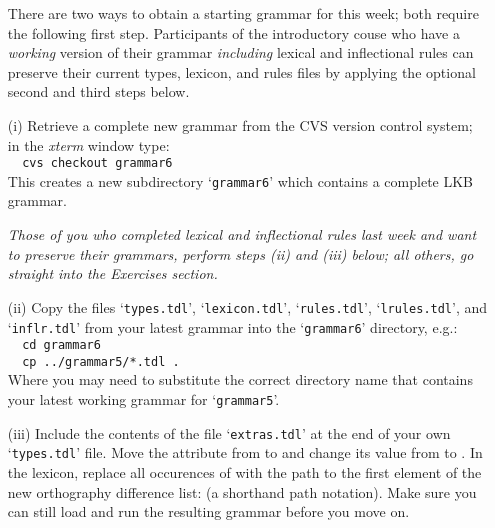 \documentclass[10pt]{article}
\begin{document}
\begin{itemize}
  \item []
        There are two ways to obtain a starting grammar for this week;
        both require the following first step.  Participants of the
        introductory couse who have a {\em working\/} version of their
        grammar {\em including\/} lexical and inflectional rules can
        preserve their current types, lexicon, and rules files by
        applying the optional second and third steps below.
  \item [(i)]
        Retrieve a complete new grammar from the CVS version control
        system; in the {\em xterm\/} window type:\\
        \verb|  cvs checkout grammar6|\\
        This creates a new subdirectory `{\tt grammar6}' which contains
        a complete LKB grammar.
  \item []
        {\em Those of you who completed lexical and inflectional rules
        last week and want to preserve their grammars, perform steps
        (ii) and (iii) below; all others, go straight into the
        Exercises section.}
  \item [(ii)]
        Copy the files `{\tt types.tdl}', `{\tt lexicon.tdl}', 
        `{\tt rules.tdl}', `{\tt lrules.tdl}', and `{\tt inflr.tdl}'
        from your latest grammar into the `{\tt grammar6}' directory,
        e.g.:\\
        \verb|  cd grammar6|\\
        \verb|  cp ../grammar5/*.tdl .|\\
        Where you may need to substitute the correct directory name that
        contains your latest working grammar for `{\tt grammar5}'.
  \item [(iii)]
        Include the contents of the file `{\tt extras.tdl}' at the end
        of your own `{\tt types.tdl}' file.
        Move the attribute  from  to
         and change its value from  to
        .
        In the lexicon, replace all occurences of  with the
        path to the first element of the new orthography difference
        list:  (a shorthand path notation).
        Make sure you can still load and run the resulting grammar
        before you move on.
\end{itemize}
\end{document}

